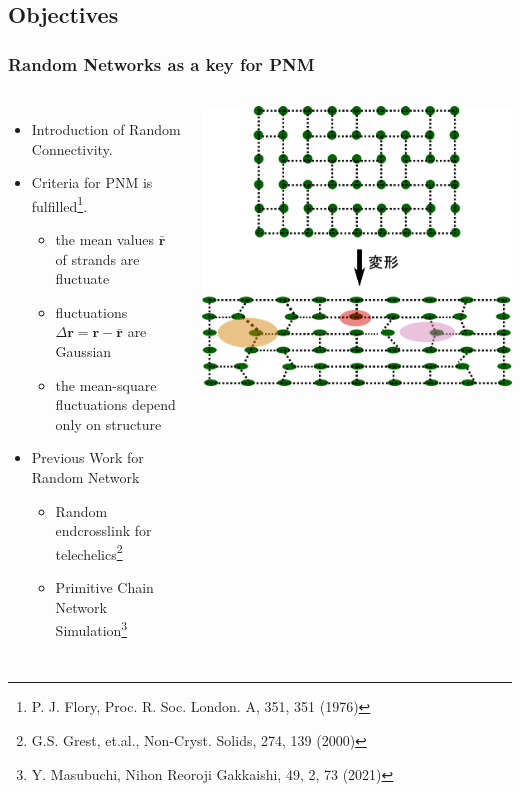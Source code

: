 \documentclass[12pt, dvipdfmx]{beamer}
\begin{document}
\subsection{Objectives}
\setcounter{footnote}{0}
\begin{frame}
	\frametitle{Random Networks as a key for PNM}
		\begin{columns}[c, onlytextwidth]
			\begin{itemize}
				\item Introduction of \alert{Random Connectivity}.
					\item \alert{Criteria for PNM} is fulfilled\footnote{
								\scriptsize{P. J. Flory, Proc. R. Soc. London. A, 351, 351 (1976)}
						}.
					\begin{itemize}
						\item the mean values $\bar{\bm{r}}$ of strands are \alert{fluctuate}
						\item fluctuations $\Delta \bm{r} = \bm{r} - \bar{\bm{r}}$ are \alert{Gaussian}
						\item the mean-square fluctuations \alert{depend only on structure}
					\end{itemize}
				\item Previous Work for Random Network
				\begin{itemize}
					\item Random endcrosslink for telechelics\footnote{
						\scriptsize{G.S. Grest, et.al., Non-Cryst. Solids, 274, 139 (2000)}
						}
					\item Primitive Chain Network Simulation\footnote{
						\scriptsize{Y. Masubuchi, Nihon Reoroji Gakkaishi, 49, 2, 73 (2021)}
					}
				\end{itemize}
			\end{itemize}
				\centering
					\includegraphics[width=\textwidth]{random_NW.png}
		\end{columns}


\end{frame}
\end{document}
